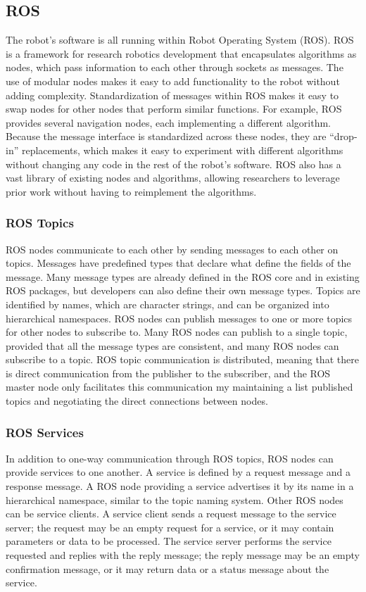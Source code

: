 \documentclass{article}
\begin{document}
\subsection{ROS}
The robot{\textquoteright}s software is all running within Robot Operating System (ROS). ROS is a framework for research robotics development that encapsulates algorithms as nodes, which pass information to each other through sockets as messages. The use of modular nodes makes it easy to add functionality to the robot without adding complexity. Standardization of messages within ROS makes it easy to swap nodes for other nodes that perform similar functions. For example, ROS provides several navigation nodes, each implementing a different algorithm. Because the message interface is standardized across these nodes, they are {\textquotedblleft}drop-in{\textquotedblright} replacements, which makes it easy to experiment with different algorithms without changing any code in the rest of the robot{\textquoteright}s software. ROS also has a vast library of existing nodes and algorithms, allowing researchers to leverage prior work without having to reimplement the algorithms.

\subsubsection[ROS Topics]{ROS Topics}
ROS nodes communicate to each other by sending messages to each other on topics. Messages have predefined types that declare what define the fields of the message. Many message types are already defined in the ROS core and in existing ROS packages, but developers can also define their own message types. Topics are identified by names, which are character strings, and can be organized into hierarchical namespaces. ROS nodes can publish messages to one or more topics for other nodes to subscribe to. Many ROS nodes can publish to a single topic, provided that all the message types are consistent, and many ROS nodes can subscribe to a topic. ROS topic communication is distributed, meaning that there is direct communication from the publisher to the subscriber, and the ROS master node only facilitates this communication my maintaining a list published topics and negotiating the direct connections between nodes.\cite{ros-pub-sub}

\subsubsection{ROS Services}
In addition to one-way communication through ROS topics, ROS nodes can provide services to one another. A service is defined by a request message and a response message. A ROS node providing a service advertises it by its name in a hierarchical namespace, similar to the topic naming system. Other ROS nodes can be service clients. A service client sends a request message to the service server; the request may be an empty request for a service, or it may contain parameters or data to be processed. The service server performs the service requested and replies with the reply message; the reply message may be an empty confirmation message, or it may return data or a status message about the service.\cite{ros-srv}
\end{document}
